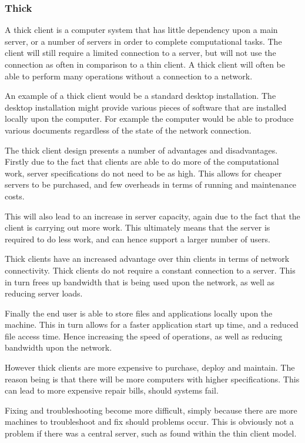 \subsubsection{Thick}

A thick client is a computer system that has little dependency upon a main 
server, or a number of servers in order to complete computational tasks. The 
client will still require a limited connection to a server, but will not use 
the connection as often in comparison to a thin client. A thick client will 
often be able to perform many operations without a connection to a network.

An example of a thick client would be a standard desktop installation. The 
desktop installation might provide various pieces of software that are 
installed locally upon the computer. For example the computer would be able to 
produce various documents regardless of the state of the network connection.

The thick client design presents a number of advantages and disadvantages. 
Firstly due to the fact that clients are able to do more of the computational 
work, server specifications do not need to be as high. This allows for cheaper 
servers to be purchased, and few overheads in terms of running and maintenance 
costs.

This will also lead to an increase in server capacity, again due to the fact 
that the client is carrying out more work. This ultimately means that the 
server is required to do less work, and can hence support a larger number of 
users.

Thick clients have an increased advantage over thin clients in terms of 
network connectivity. Thick clients do not require a constant connection to a 
server. This in turn frees up bandwidth that is being used upon the network, 
as well as reducing server loads.

Finally the end user is able to store files and applications locally upon the
machine. This in turn allows for a faster application start up time, and a 
reduced file access time. Hence increasing the speed of operations, as well as 
reducing bandwidth upon the network.

However thick clients are more expensive to purchase, deploy and maintain. The 
reason being is that there will be more computers with higher specifications. 
This can lead to more expensive repair bills, should systems fail.

Fixing and troubleshooting become more difficult, simply because there are more
machines to troubleshoot and fix should problems occur. This is obviously not a
problem if there was a central server, such as found within the thin client 
model. 